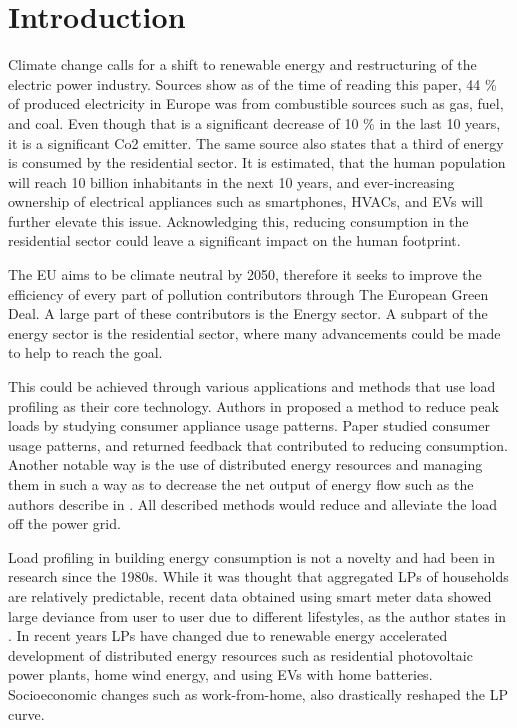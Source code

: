 \chapter{Introduction}
\label{chapter1}

Climate change calls for a shift to renewable energy and restructuring of the electric power industry.
Sources \cite{eurostat2020} show as of the time of reading this paper, 44 \% of produced electricity in Europe was from combustible sources such as gas, fuel, and coal. Even 
though that is a significant decrease of 10 \% in the last 10 years, it is a significant Co2 emitter.
The same source \cite{eurostat2020} also states that a third of energy is consumed by the residential sector. It is estimated, 
that the human population will reach 10 billion inhabitants in the next 10 years, and ever-increasing ownership of electrical appliances such as smartphones, HVACs, and EVs will further elevate this issue.
Acknowledging this, reducing consumption in the residential sector could leave a significant impact on the human footprint. 


The EU aims to be climate neutral by 2050, therefore it seeks to improve the efficiency of every part of pollution contributors through The European Green Deal.
A large part of these contributors is the Energy sector.
A subpart of the energy sector is the residential sector, where many advancements could be made to help to reach the goal.  

This could be achieved through various applications and methods that use load profiling as their core technology.
Authors in \cite{Chuan2014} proposed a method to reduce peak loads by studying consumer
appliance usage patterns. Paper \cite{Csoknyai2019} studied consumer usage patterns, and returned feedback that contributed to reducing consumption.
Another notable way is the use of distributed energy resources and managing them in such a way as to decrease the net output of energy flow such as the authors describe in
\cite{MORENOJARAMILLO2021445}. All described methods would reduce and alleviate the load off the power grid.

Load profiling in building energy consumption is not a novelty and had been in research since the 1980s.
While it was thought that aggregated LPs of households are relatively predictable, recent data obtained using smart meter data showed large deviance from user to user due to different lifestyles, as the author states in \cite{Review2021}.
In recent years LPs have changed due to renewable energy accelerated development of distributed energy resources such as residential photovoltaic
power plants, home wind energy, and using EVs with home batteries. Socioeconomic changes such as work-from-home, also drastically reshaped the LP curve. 

